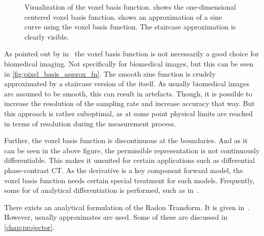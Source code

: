 \begin{figure}
	\centering
	\caption{Visualization of the voxel basis function. 
		shows the one-dimensional centered voxel basis function.
		 shows an approximation of a sine curve using the
		voxel basis function. The staircase approximation is clearly visible.
	}\label{fig:pixel_basis_function}
\end{figure}

As pointed out by \citeauthor*{lewitt_multidimensional_1990}
in~\cite{lewitt_multidimensional_1990,lewitt_alternatives_1992} the voxel basis function is not
necessarily a good choice for biomedical imaging. Not specifically for biomedical images, but this
can be seen in \autoref{fig:pixel_basis_approx_fn}. The smooth sine function is crudely approximated
by a staircase version of the itself. As usually biomedical images are assumed to be smooth, this
can result in artefacts. Though, it is possible to increase the resolution of the sampling rate and
increase accuracy that way. But this approach is rather suboptimal, as at some point physical limits
are reached in terms of resolution during the measurement process.

Further, the voxel basis function is discontinuous at the boundaries. And as it can be seen in the
above figure, the permissible representation is not continuously differentiable. This makes it
unsuited for certain applications such as differential phase-contrast CT\@. As the derivative is a
key component forward model, the voxel basis function needs certain special treatment for such
models. Frequently, some for of analytical differentiation is performed, such as
in~\cite{xu_investigation_2012}.

There exists an analytical formulation of the Radon Transform. It is given
in~\cite{toft_radon_1996}. However, usually approximates are used. Some of these are discussed in
\autoref{chap:projector}.

